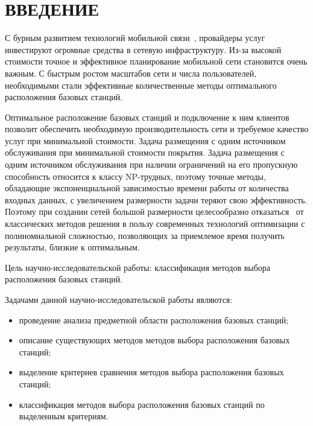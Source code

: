 \chapter*{ВВЕДЕНИЕ}

С бурным развитием технологий мобильной связи~\cite{development}, провайдеры услуг инвестируют огромные средства в сетевую инфраструктуру. Из-за высокой стоимости точное и эффективное планирование мобильной сети становится очень важным. С быстрым ростом масштабов сети и числа пользователей, необходимыми стали эффективные количественные методы оптимального расположения базовых станций.

Оптимальное расположение базовых станций и подключение к ним клиентов позволит обеспечить необходимую производительность сети и требуемое качество услуг при минимальной стоимости. Задача размещения с одним источником обслуживания при минимальной стоимости покрытия. Задача размещения с одним источником обслуживания при наличии ограничений на его пропускную способность относится к классу NP-трудных, поэтому точные методы, обладающие экспоненциальной зависимостью времени работы от количества входных данных, с увеличением размерности задачи теряют свою эффективность. Поэтому при создании сетей большой размерности целесообразно отказаться~\cite{req-cost} от классических методов решения в пользу современных технологий оптимизации с полиномиальной сложностью, позволяющих за приемлемое время получить результаты, близкие к оптимальным.

Цель научно-исследовательской работы: классификация методов выбора расположения базовых станций.

Задачами данной научно-исследовательской работы являются:
\begin{itemize}[label=---]
	\item проведение анализа предметной области расположения базовых станций;
	\item описание существующих методов методов выбора расположения базовых станций;
	\item выделение критериев сравнения методов  выбора расположения базовых станций;
	\item классификация методов выбора расположения базовых станций по выделенным критериям.
\end{itemize}
